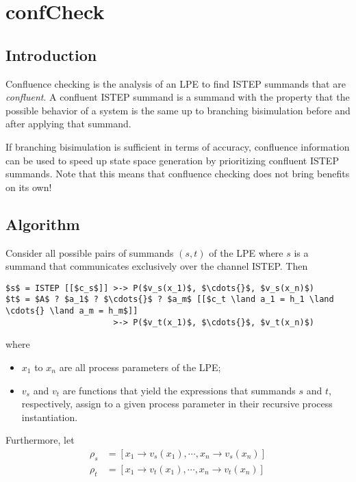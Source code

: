 \chapter{confCheck}

\section{Introduction}

Confluence checking is the analysis of an LPE to find ISTEP summands that are \emph{confluent}.
A confluent ISTEP summand is a summand with the property that the possible behavior of a system is the same up to branching bisimulation before and after applying that summand.

If branching bisimulation is sufficient in terms of accuracy, confluence information can be used to speed up state space generation by prioritizing confluent ISTEP summands.
Note that this means that confluence checking does not bring benefits on its own!

\section{Algorithm}

Consider all possible pairs of summands $(s, t)$ of the LPE where $s$ is a summand that communicates exclusively over the channel ISTEP.
Then

\begin{lstlisting}[mathescape]
$s$ = ISTEP [[$c_s$]] >-> P($v_s(x_1)$, $\cdots{}$, $v_s(x_n)$)
$t$ = $A$ ? $a_1$ ? $\cdots{}$ ? $a_m$ [[$c_t \land a_1 = h_1 \land \cdots{} \land a_m = h_m$]]
                      >-> P($v_t(x_1)$, $\cdots{}$, $v_t(x_n)$)
\end{lstlisting}

where

\begin{itemize}
\item $x_1$ to $x_n$ are all process parameters of the LPE;
\item $v_s$ and $v_t$ are functions that yield the expressions that summands $s$ and $t$, respectively, assign to a given process parameter in their recursive process instantiation.
\end{itemize}

Furthermore, let
\begin{align*}
\rho_s &= [x_1 \rightarrow v_s(x_1), \cdots{}, x_n \rightarrow v_s(x_n)] \\
\rho_t &= [x_1 \rightarrow v_t(x_1), \cdots{}, x_n \rightarrow v_t(x_n)]
\end{align*}

